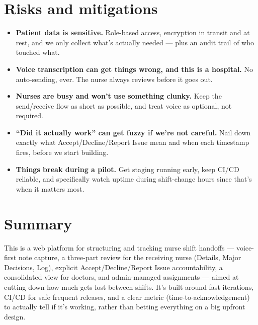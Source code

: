 \documentclass[11pt,a4paper]{article}
\begin{document}
\section{Risks and mitigations}
\begin{itemize}[leftmargin=0.7cm]
    \item \textbf{Patient data is sensitive.} Role-based access, encryption in transit and at rest, and we only collect what's actually needed --- plus an audit trail of who touched what.
    \item \textbf{Voice transcription can get things wrong, and this is a hospital.} No auto-sending, ever. The nurse always reviews before it goes out.
    \item \textbf{Nurses are busy and won't use something clunky.} Keep the send/receive flow as short as possible, and treat voice as optional, not required.
    \item \textbf{``Did it actually work'' can get fuzzy if we're not careful.} Nail down exactly what Accept/Decline/Report Issue mean and when each timestamp fires, before we start building.
    \item \textbf{Things break during a pilot.} Get staging running early, keep CI/CD reliable, and specifically watch uptime during shift-change hours since that's when it matters most.
\end{itemize}

\section{Summary}
This is a web platform for structuring and tracking nurse
shift handoffs --- voice-first note capture, a three-part
review for the receiving nurse (Details, Major Decisions,
Log), explicit Accept/Decline/Report Issue accountability, a
consolidated view for doctors, and admin-managed assignments
--- aimed at cutting down how much gets lost between shifts.
It's built around fast iterations, CI/CD for safe frequent
releases, and a clear metric (time-to-acknowledgement) to
actually tell if it's working, rather than betting everything
on a big upfront design.
\end{document}
